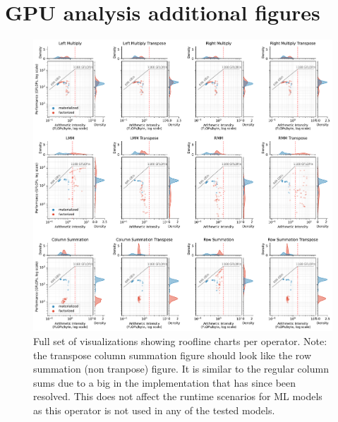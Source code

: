 \chapter{GPU analysis additional figures}
\label{appendix:analysis-additional-figures}

\begin{figure}
    \centering
    \includegraphics[width=1.0\textwidth]{appendices/figures/roofline-operators.pdf}
    \caption{Full set of visualizations showing roofline charts per operator. Note: the transpose column summation figure should look like the row summation (non tranpose) figure. It is similar to the regular column sums due to a big in the implementation that has since been resolved. This does not affect the runtime scenarios for ML models as this operator is not used in any of the tested models. }
    \label{fig:additional-operator-rooflines}
\end{figure}
